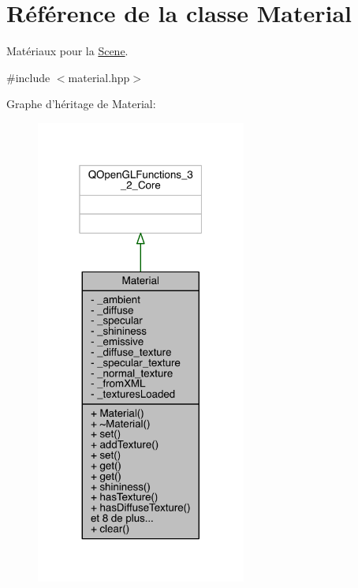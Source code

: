 \hypertarget{class_material}{\section{Référence de la classe Material}
\label{class_material}
}


Matériaux pour la \hyperlink{class_scene}{Scene}.  




{\ttfamily \#include $<$material.\+hpp$>$}



Graphe d'héritage de Material\+:
\nopagebreak
\begin{figure}[H]
\begin{center}
\leavevmode
\includegraphics[width=196pt]{class_material__inherit__graph}
\end{center}
\end{figure}


